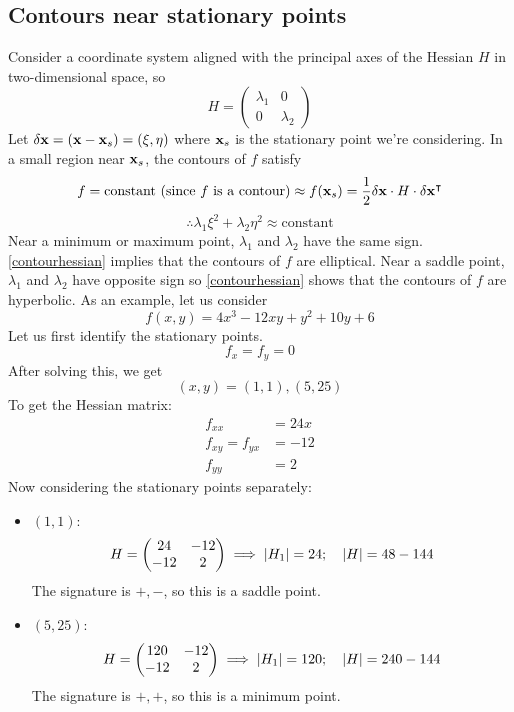 \subsection{Contours near stationary points}
Consider a coordinate system aligned with the principal axes of the Hessian \(H\) in two-dimen\-sional space, so
\[
	H = \begin{pmatrix}
		\lambda_1 & 0 \\ 0 & \lambda_2
	\end{pmatrix}
\]
Let \(\delta \vb x = (\vb x - \vb x_s) = (\xi, \eta)\) where \(\vb x_s\) is the stationary point we're considering.
In a small region near \(\vb x_s\), the contours of \(f\) satisfy
\[
	f = \text{constant (since \(f\) is a contour)} \approx f(\vb x_s) = \frac{1}{2}\delta \vb x \cdot H \cdot \delta \vb x^\intercal
\]
\begin{equation}\label{contourhessian}
	\therefore \lambda_1 \xi^2 + \lambda_2 \eta^2 \approx \text{constant}
\end{equation}
Near a minimum or maximum point, \(\lambda_1\) and \(\lambda_2\) have the same sign.
\eqref{contourhessian} implies that the contours of \(f\) are elliptical.
Near a saddle point, \(\lambda_1\) and \(\lambda_2\) have opposite sign so \eqref{contourhessian} shows that the contours of \(f\) are hyperbolic.
As an example, let us consider
\[
	f(x,y) = 4x^3 - 12xy + y^2 + 10y + 6
\]
Let us first identify the stationary points.
\[
	f_x = f_y = 0
\]
After solving this, we get
\[
	(x,y) = (1, 1), (5, 25)
\]
To get the Hessian matrix:
\begin{align*}
	f_{xx}          & = 24x \\
	f_{xy} = f_{yx} & = -12 \\
	f_{yy}          & = 2
\end{align*}
Now considering the stationary points separately:
\begin{itemize}
	\item \((1, 1)\):
	      \[
		      H = \begin{pmatrix}
			      24 & -12 \\ -12 & 2
		      \end{pmatrix} \implies \abs{H_1} = 24;\quad \abs{H} = 48-144
	      \]
	      The signature is \(+, -\), so this is a saddle point.
	\item \((5, 25)\):
	      \[
		      H = \begin{pmatrix}
			      120 & -12 \\ -12 & 2
		      \end{pmatrix} \implies \abs{H_1} = 120;\quad \abs{H} = 240-144
	      \]
	      The signature is \(+, +\), so this is a minimum point.
\end{itemize}
